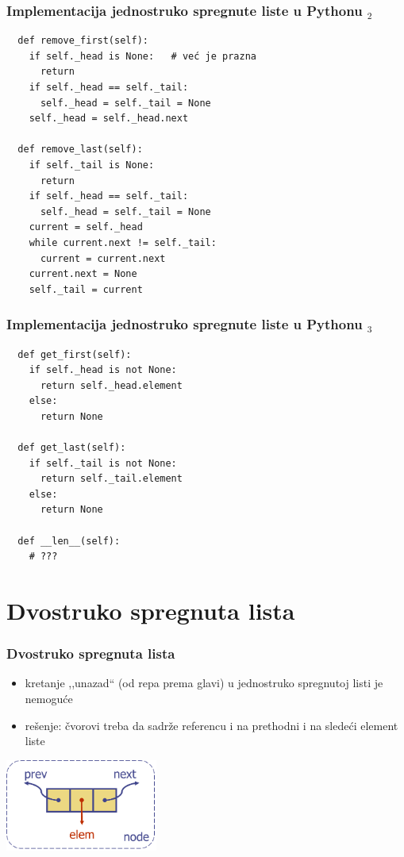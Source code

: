 \documentclass[compress]{beamer}
\begin{document}
\begin{frame}
  \frametitle{Implementacija jednostruko spregnute liste u Pythonu $_2$}
\begin{verbatim}
  def remove_first(self):
    if self._head is None:   # već je prazna
      return
    if self._head == self._tail:
      self._head = self._tail = None
    self._head = self._head.next
    
  def remove_last(self):
    if self._tail is None:
      return
    if self._head == self._tail:
      self._head = self._tail = None
    current = self._head
    while current.next != self._tail:
      current = current.next
    current.next = None
    self._tail = current
\end{verbatim}
\end{frame}

\begin{frame}
  \frametitle{Implementacija jednostruko spregnute liste u Pythonu $_3$}
\begin{verbatim}
  def get_first(self):
    if self._head is not None:
      return self._head.element
    else:
      return None
        
  def get_last(self):
    if self._tail is not None:
      return self._tail.element
    else:
      return None
  
  def __len__(self):
    # ???
\end{verbatim}
\end{frame}

\section[2-Lista]{Dvostruko spregnuta lista}
\begin{frame}[fragile]
  \frametitle{Dvostruko spregnuta lista}
  \begin{itemize}
    \item kretanje ,,unazad`` (od repa prema glavi) u jednostruko spregnutoj listi je nemoguće
    \item rešenje: čvorovi treba da sadrže referencu i na prethodni i na sledeći element liste
  \end{itemize}
  \begin{center}
    \includegraphics[width=5cm]{asp-07-pic06.png}
  \end{center}
\end{frame}
\end{document}
